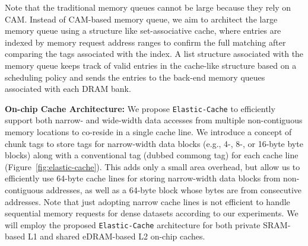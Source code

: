 Note that the traditional memory queues cannot be large because they rely on CAM.
Instead of CAM-based memory queue, we aim to architect the large memory queue using a structure like set-associative cache, where entries are indexed by memory request address ranges to confirm the full matching after comparing the tags associated with the index.
A list structure associated with the memory queue keeps track of valid entries in the cache-like structure based on a scheduling policy and sends the entries to the back-end memory queues associated with each DRAM bank.


 


\noindent
\textbf{On-chip Cache Architecture:} 
We propose \texttt{Elastic-Cache} to efficiently support both narrow- and wide-width data accesses from multiple non-contiguous memory locations to co-reside in a single cache line. 
We introduce a concept of chunk tags to store tags for narrow-width data blocks (e.g., 4-, 8-, or 16-byte byte blocks) along with a conventional tag (dubbed commong tag) for each cache line (Figure~\ref{fig:elastic-cache}). 
This adds only a small area overhead, but allow us to efficiently use 64-byte cache lines for storing narrow-width data blocks from non-contiguous addresses, as well as a 64-byte block whose bytes are from consecutive addresses.
Note that just adopting narrow cache lines is not efficient to handle sequential memory requests for dense datasets according to our experiments.
We will employ the proposed \texttt{Elastic-Cache} architecture for both private SRAM-based L1 and shared eDRAM-based L2 on-chip caches.

